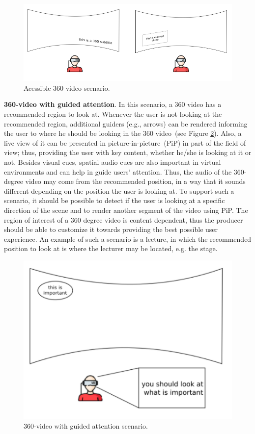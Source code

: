\begin{figure}[!ht]
    \centering
    \includegraphics[width=0.7\linewidth]{img/video360/accessible.png}
    \caption{Acessible 360-video scenario.}
    \label{fig:cenario_acessivel}
\end{figure}

\textbf{360-video with guided attention}.
In this scenario, a 360 video has a recommended region to look at.
Whenever the user is not looking at the recommended region, additional guiders
(e.g., arrows) can be rendered informing the user to where he should be
looking in the 360 video~(see Figure \ref{fig:cenario_guiado}).
Also, a live view of it can be presented in picture-in-picture~(PiP) in part
of the field of view; thus, providing the user with key content, whether he/she is looking at it or
not.
Besides visual cues, spatial audio cues are also important in virtual
environments and can help in guide users' attention.
Thus, the audio of the 360-degree video may come from the recommended
position, in a way that it sounds different depending on the position the user
is looking at. 
To support such a scenario, it should be possible to detect if the user is
looking at a specific direction of the scene and to render another segment of
the video using PiP.
The region of interest of a 360 degree video is content dependent, thus the
producer should be able to customize it towards providing the best possible
user experience.
An example of such a scenario is a lecture, in which the recommended position
to look at is where the lecturer may be located, e.g. the stage.

\begin{figure}[!ht]
    \centering
    \includegraphics[width=0.35\linewidth]{img/video360/guided.png}
    \caption{360-video with guided attention scenario.}
    \label{fig:cenario_guiado}
\end{figure}

